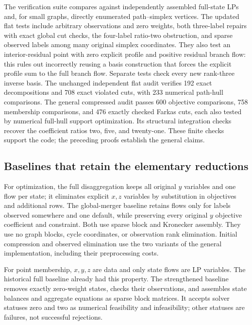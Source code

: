 The verification suite compares against independently assembled full-state
LPs and, for small graphs, directly enumerated path--simplex vertices.
The updated flat tests include arbitrary observations and zero weights,
both three-label repairs with exact global cut checks, the four-label
ratio-two obstruction, and sparse observed labels among many original
simplex coordinates. They also test an interior-residual point with zero
explicit profile and positive residual branch flow: this rules out
incorrectly reusing a basis construction that forces the explicit profile
sum to the full branch flow. Separate tests check every new rank-three
inverse basis. The unchanged independent flat audit verifies 192 exact
decompositions and 708 exact violated cuts, with 233 numerical path-hull
comparisons. The general compressed audit passes 600 objective comparisons,
758 membership comparisons, and 476 exactly checked Farkas cuts, each also
tested by numerical full-hull support optimization. Its structural integration
checks recover the coefficient ratios two, five, and twenty-one. These finite
checks support the code; the preceding proofs establish the general claims.

\subsection{Baselines that retain the elementary reductions}

For optimization, the full disaggregation keeps all original $y$ variables
and one flow per state; it eliminates explicit $x,z$ variables by substitution
in objectives and additional rows. The global-merger baseline retains flows
only for labels observed somewhere and one default, while preserving every
original $y$ objective coefficient and constraint. Both use sparse block and
Kronecker assembly. They use no graph blocks, cycle coordinates, or observation
rank elimination. Initial compression and observed elimination use the two
variants of the general implementation, including their preprocessing costs.

For point membership, $x,y,z$ are data and only state flows are LP variables.
The historical full baseline already had this property. The strengthened
baseline removes exactly zero-weight states, checks their observations, and
assembles state balances and aggregate equations as sparse block matrices.
It accepts solver statuses zero and two as numerical feasibility and
infeasibility; other statuses are failures, not successful rejections.


